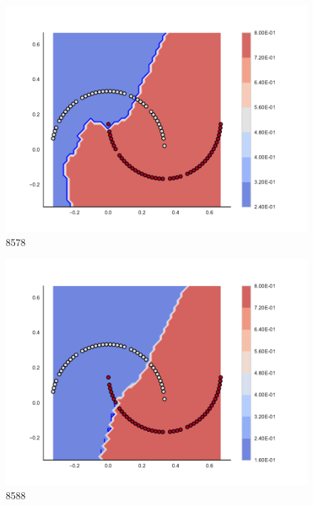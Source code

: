 \begin{subfigure}[b]{0.09\textwidth}
    \includegraphics[clip, trim=2.35cm 1.75cm 4.5cm 0cm,width=\textwidth]{img/convergence/8578.pdf}
    \caption{8578}
    \label{fig:convergence_8578}
\end{subfigure}
%
\begin{subfigure}[b]{0.09\textwidth}
    \includegraphics[clip, trim=2.35cm 1.75cm 4.5cm 0cm,width=\textwidth]{img/convergence/8588.pdf}
    \caption{8588}
    \label{fig:convergence_8588}
\end{subfigure}
%

